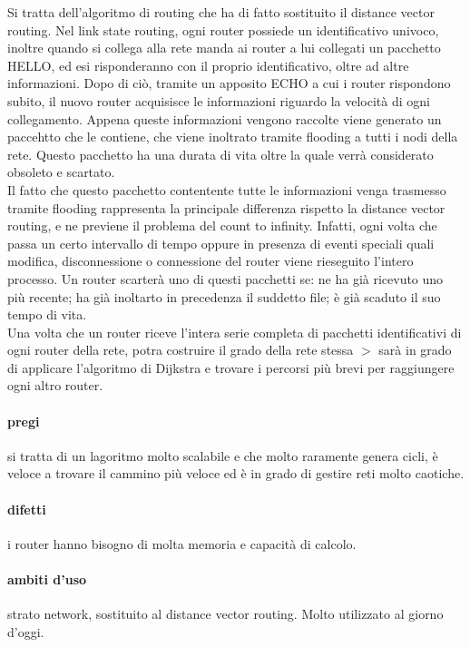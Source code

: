 \documentclass{article}
\begin{document}
Si tratta dell'algoritmo di routing che ha di fatto sostituito il distance
vector routing. Nel link state routing, ogni router possiede un identificativo
univoco, inoltre quando si collega alla rete manda ai router a lui collegati un
pacchetto HELLO, ed esi risponderanno con il proprio identificativo, oltre ad
altre informazioni. Dopo di ciò, tramite un apposito ECHO a cui i router
rispondono subito, il nuovo router acquisisce le informazioni riguardo la
velocità di ogni collegamento. Appena queste informazioni vengono raccolte viene
generato un paccehtto che le contiene, che viene inoltrato tramite flooding a
tutti i nodi della rete. Questo pacchetto ha una durata di vita oltre la quale
verrà considerato obsoleto e scartato.\\
Il fatto che questo pacchetto contentente tutte le informazioni venga trasmesso
tramite flooding rappresenta la principale differenza rispetto la distance
vector routing, e ne previene il problema del count to infinity. Infatti, ogni
volta che passa un certo intervallo di tempo oppure in presenza di eventi
speciali quali modifica, disconnessione o connessione del router viene
rieseguito l'intero processo. Un router scarterà uno di questi pacchetti se: ne
ha già ricevuto uno più recente; ha già inoltarto in precedenza il suddetto
file; è già scaduto il suo tempo di vita.\\
Una volta che un router riceve l'intera serie completa di pacchetti
identificativi di ogni router della rete, potra costruire il grado della rete
stessa $>$ sarà in grado di applicare l'algoritmo di Dijkstra e trovare i
percorsi più brevi per raggiungere ogni altro router.

\paragraph{pregi} si tratta di un lagoritmo molto scalabile e che molto
raramente genera cicli, è veloce a trovare il cammino più veloce ed è in grado
di gestire reti molto caotiche.

\paragraph{difetti} i router hanno bisogno di molta memoria e capacità di
calcolo.

\paragraph{ambiti d'uso} strato network, sostituito al distance vector routing.
Molto utilizzato al giorno d'oggi.
\end{document}
